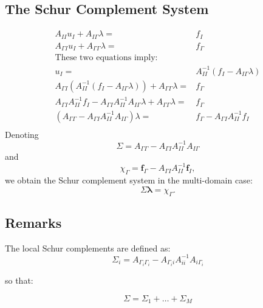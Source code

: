 \documentclass[11pt]{book}
\begin{document}
\subsection*{The Schur Complement System}

\begin{align*}
    A_{II} u_I + A_{I\Gamma} \lambda = &f_I \quad  \\
    A_{\Gamma I} u_I + A_{\Gamma\Gamma} \lambda =& f_\Gamma \quad  \\ 
    \text{These two equations imply:}\\
    u_I = &A_{II}^{-1}(f_I - A_{I\Gamma} \lambda)   \\
    A_{\Gamma I} (A_{II}^{-1} (f_I - A_{I\Gamma} \lambda)) + A_{\Gamma\Gamma} \lambda =& f_\Gamma \\
    A_{\Gamma I} A_{II}^{-1} f_I - A_{\Gamma I} A_{II}^{-1} A_{I\Gamma} \lambda + A_{\Gamma\Gamma} \lambda =& f_\Gamma \\
    (A_{\Gamma\Gamma} - A_{\Gamma I} A_{II}^{-1} A_{I\Gamma}) \lambda = &f_\Gamma - A_{\Gamma I} A_{II}^{-1} f_I \\
\end{align*}
Denoting
\begin{equation*}
\Sigma = A_{\Gamma\Gamma} - A_{\Gamma I} A_{II}^{-1} A_{I\Gamma}
\end{equation*}
and
\begin{equation*}
\chi_{\Gamma} = \mathbf{f}_{\Gamma} - A_{\Gamma I} A_{II}^{-1} \mathbf{f}_{I},
\end{equation*}
we obtain the Schur complement system in the multi-domain case:
\begin{equation*}
\Sigma \boldsymbol{\lambda} = \chi_{\Gamma}.
\end{equation*}


\subsection*{Remarks}
The local Schur complements are defined as:
\begin{equation*}
    \Sigma_{i} = A_{\Gamma_{i} \Gamma_{i}} - A_{\Gamma_{i} i} A_{i i}^{-1} A_{i \Gamma_{i}}
\end{equation*}

so that:

\begin{equation*}
    \Sigma = \Sigma_{1} + \ldots + \Sigma_{M}
\end{equation*}
\end{document}
